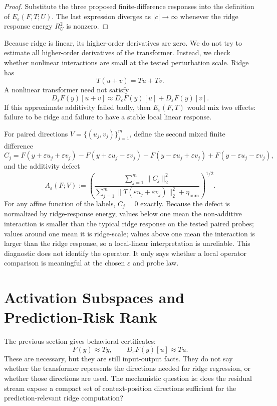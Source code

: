 \documentclass[11pt]{article}
\begin{document}
\begin{proof}
Substitute the three proposed finite-difference responses into the definition of
\(E_\varepsilon(F,T;U)\). The last expression diverges as \(|c|\to\infty\) whenever the ridge
response energy \(R_U^2\) is nonzero.
\end{proof}

Because ridge is linear, its higher-order derivatives are zero. We do not try to estimate all
higher-order derivatives of the transformer. Instead, we check whether nonlinear interactions are
small at the tested perturbation scale. Ridge has
\[
T(u+v)=Tu+Tv.
\]
A nonlinear transformer need not satisfy
\[
D_\varepsilon F(y)[u+v]\approx D_\varepsilon F(y)[u]+D_\varepsilon F(y)[v].
\]
If this approximate additivity failed badly, then \(E_\varepsilon(F,T)\) would mix two effects:
failure to be ridge and failure to have a stable local linear response.

For paired directions \(V=\{(u_j,v_j)\}_{j=1}^m\), define the second mixed finite difference
\[
C_j =
F(y+\varepsilon u_j+\varepsilon v_j)
-F(y+\varepsilon u_j-\varepsilon v_j)
-F(y-\varepsilon u_j+\varepsilon v_j)
+F(y-\varepsilon u_j-\varepsilon v_j),
\]
and the additivity defect
\[
A_\varepsilon(F;V)
:=
\left(
\frac{
\sum_{j=1}^m\|C_j\|_2^2
}{
\sum_{j=1}^m\|T(\varepsilon u_j+\varepsilon v_j)\|_2^2+\eta_{\mathrm{num}}
}
\right)^{1/2}.
\]
For any affine function of the labels, \(C_j=0\) exactly. Because the defect is normalized by
ridge-response energy, values below one mean the non-additive interaction is smaller than the
typical ridge response on the tested paired probes; values around one mean it is ridge-scale; values
above one mean the interaction is larger than the ridge response, so a local-linear interpretation is
unreliable. This diagnostic does not identify the operator. It only says whether a local operator
comparison is meaningful at the chosen \(\varepsilon\) and probe law.

\section{Activation Subspaces and Prediction-Risk Rank}

The previous section gives behavioral certificates:
\[
F(y)\approx Ty,\qquad D_\varepsilon F(y)[u]\approx Tu.
\]
These are necessary, but they are still input-output facts. They do not say whether the transformer
represents the directions needed for ridge regression, or whether those directions are used. The
mechanistic question is: does the residual stream expose a compact set of context-position
directions sufficient for the prediction-relevant ridge computation?
\end{document}
